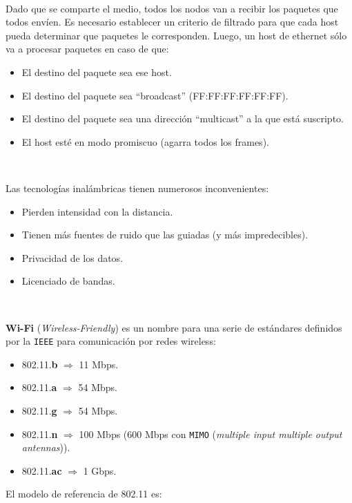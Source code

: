 \documentclass[]{article}
\begin{document}
~\newline

Dado que se comparte el medio, todos los nodos van a recibir los paquetes que todos envíen. Es necesario establecer un criterio de filtrado para que cada host pueda determinar que paquetes le corresponden. Luego, un host de ethernet sólo va a procesar paquetes en caso de que:
\begin{itemize}
    \item El destino del paquete sea ese host.
    \item El destino del paquete sea ``broadcast'' (FF:FF:FF:FF:FF:FF).
    \item El destino del paquete sea una dirección ``multicast'' a la que está suscripto.
    \item El host esté en modo promiscuo (agarra todos los frames).
\end{itemize}

~\newline

Las tecnologías inalámbricas tienen numerosos inconvenientes:
\begin{itemize}
    \item Pierden intensidad con la distancia.
    \item Tienen más fuentes de ruido que las guiadas (y más impredecibles).
    \item Privacidad de los datos.
    \item Licenciado de bandas.
\end{itemize}

~\newline

\textbf{Wi-Fi} (\emph{Wireless-Friendly}) es un nombre para una serie de estándares definidos por la \texttt{IEEE} para comunicación por redes wireless:
\begin{itemize}
    \item 802.11.\textbf{b} $\Rightarrow$ 11 Mbps.
    \item 802.11.\textbf{a} $\Rightarrow$ 54 Mbps.
    \item 802.11.\textbf{g} $\Rightarrow$ 54 Mbps.
    \item 802.11.\textbf{n} $\Rightarrow$ 100 Mbps (600 Mbps con \texttt{MIMO} (\emph{multiple input multiple output antennas})).
    \item 802.11.\textbf{ac} $\Rightarrow$ 1 Gbps.
\end{itemize}

El modelo de referencia de 802.11 es:
\end{document}
